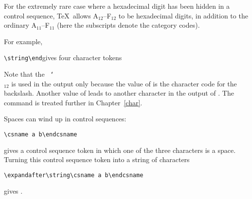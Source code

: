 \documentclass{book}
\begin{document}
For the extremely rare case where a hexadecimal digit has been
hidden in a control sequence, \TeX\ allows \n A$_{12}$--\n F$_{12}$
to be hexadecimal digits, in addition to the ordinary
\n A$_{11}$--\n F$_{11}$ (here
the subscripts denote the category codes).

For example,
\begin{disp}\verb>\string\end>\quad gives four character tokens\quad
{} \end{disp}
Note that the ~\texttt{\char`\\}$_{12}$\label{use:escape}
is used in the output only because the
value of  is the character code for the
backslash. Another value of  leads to another
character in the output of . 
The  command is treated further in Chapter~\ref{char}.

Spaces can wind up in control sequences:
\begin{disp}\verb>\csname a b\endcsname>\end{disp} gives a control sequence
token in which one of the three characters is a space.
Turning this control sequence token into a string of characters
\begin{disp}\verb>\expandafter\string\csname a b\endcsname>\end{disp}
gives .
\end{document}
